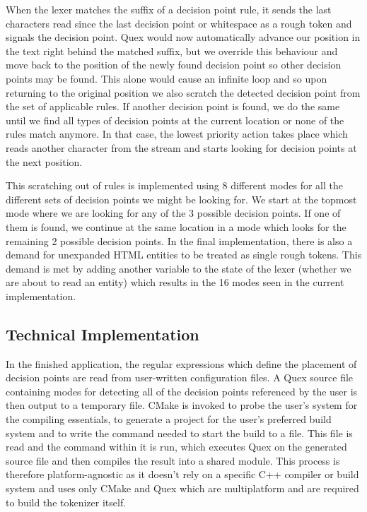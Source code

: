 When the lexer matches the suffix of a decision point rule, it sends the last
characters read since the last decision point or whitespace as a rough token
and signals the decision point. Quex would now automatically advance our
position in the text right behind the matched suffix, but we override this
behaviour and move back to the position of the newly found decision point so
other decision points may be found. This alone would cause an infinite loop and
so upon returning to the original position we also scratch the detected
decision point from the set of applicable rules. If another decision point is
found, we do the same until we find all types of decision points at the current
location or none of the rules match anymore. In that case, the lowest priority
action takes place which reads another character from the stream and starts
looking for decision points at the next position.

This scratching out of rules is implemented using 8 different modes for all the
different sets of decision points we might be looking for. We start at the
topmost mode where we are looking for any of the 3 possible decision points. If
one of them is found, we continue at the same location in a mode which looks
for the remaining 2 possible decision points. In the final implementation,
there is also a demand for unexpanded HTML entities to be treated as single
rough tokens. This demand is met by adding another variable to the state of
the lexer (whether we are about to read an entity) which results in the 16
modes seen in the current implementation.

\subsection{Technical Implementation}
\label{ssec:impl-roughtok-technical}

In the finished application, the regular expressions which define the placement
of decision points are read from user-written configuration files. A Quex
source file containing modes for detecting all of the decision points
referenced by the user is then output to a temporary file. CMake
\cite{web-cmake} is invoked to probe the user's system for the compiling
essentials, to generate a project for the user's preferred build system and to
write the command needed to start the build to a file. This file is read and
the command within it is run, which executes Quex on the generated source file
and then compiles the result into a shared module. This process is therefore
platform-agnostic as it doesn't rely on a specific C++ compiler or build system
and uses only CMake and Quex which are multiplatform and are required to build
the tokenizer itself.

